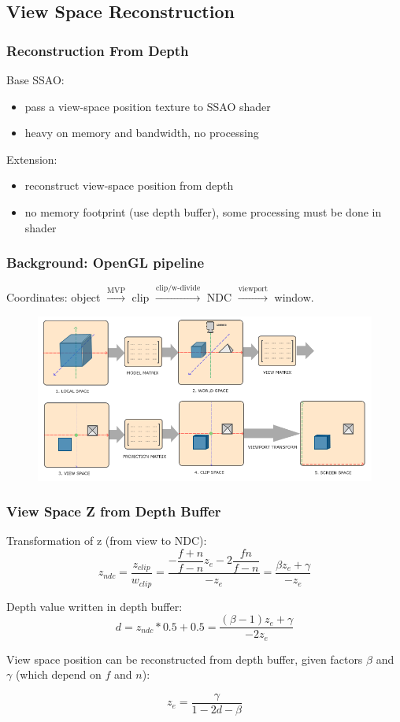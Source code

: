 \documentclass{beamer}
\begin{document}
\subsection{View Space Reconstruction}
\begin{frame}
\frametitle{Reconstruction From Depth}
Base SSAO:
\begin{itemize}
    \item pass a view-space position texture to SSAO shader
    \item heavy on memory and bandwidth, no processing
\end{itemize}

Extension:
\begin{itemize}
    \item reconstruct view-space position from depth
    \item no memory footprint (use depth buffer), some processing must be done in shader
\end{itemize}
\end{frame}

\newcommand{\transform}[1]{$ \xrightarrow{\text{#1}} $}
\begin{frame}

\frametitle{Background: OpenGL pipeline}
Coordinates: object \transform{MVP} clip \transform{clip/w-divide} NDC \transform{viewport} window.
\begin{figure}
    \centering
    \includegraphics[width=0.9\linewidth]{images/coordinate_systems.png}
\end{figure}

\end{frame}

\begin{frame}
\frametitle{View Space Z from Depth Buffer}
\label{frame:viewspace-from-depth-buffer}

Transformation of z (from view to NDC):
\[
z_{ndc} = \dfrac{z_{clip}}{w_{clip}} = \dfrac{-\dfrac{f+n}{f-n} z_e -2 \dfrac{fn}{f-n}}{-z_e} = \dfrac{\beta z_e + \gamma}{-z_e}
\]

Depth value written in depth buffer:
\[
d = z_{ndc} * 0.5 + 0.5 = \dfrac{(\beta - 1) z_e + \gamma}{-2z_e}
\]

View space position can be reconstructed from depth buffer, given factors $ \beta $ and $ \gamma $ (which depend on $ f $ and $ n $):

\[
z_e = \dfrac{\gamma}{1-2d-\beta}
\]
\end{frame}
\end{document}
